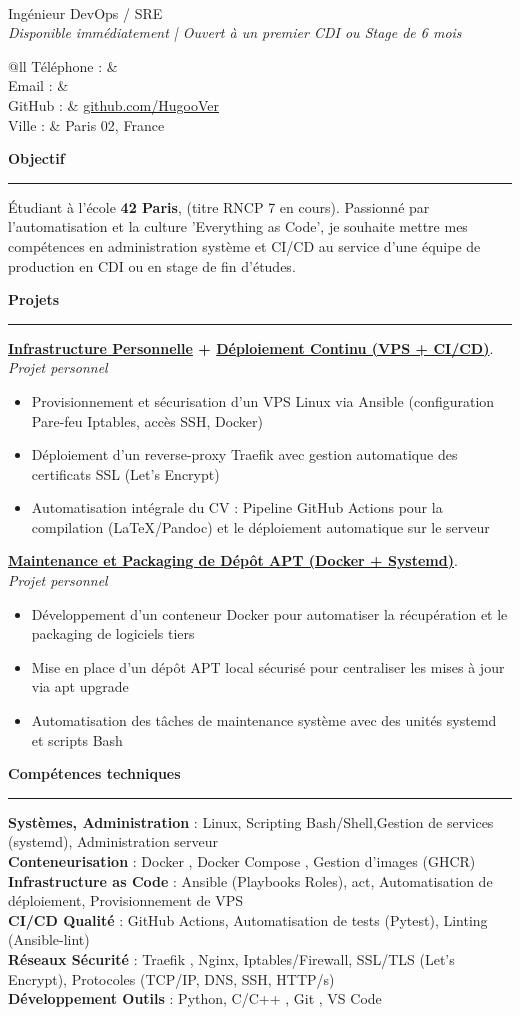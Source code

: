 \documentclass[10pt,a4paper]{article}
\makeatletter
\newcommand{\nom}{\detokenize{${NAME}}}
\newcommand{\poste}{Ingénieur DevOps / SRE}
\newcommand{\mail}{\detokenize{${MAIL}}}
\newcommand{\phone}{\detokenize{${PHONE}}}
\newcommand{\makecvheader}{
      \begin{minipage}[t]{0.6\textwidth}
        {\huge \textbf{\nom}}\\[0.2em]
        {\large \poste}\\[0.5em]
        \textit{Disponible immédiatement | Ouvert à un premier CDI ou Stage de 6 mois}
      \end{minipage}
      \hfill
      \begin{minipage}[t]{0.35\textwidth}
        \begin{tabular}{@{}ll}
          Téléphone : & \phone \\
          Email : & \href{mailto:\mail}{\mail{}} \\
          GitHub : & \href{https://github.com/HugooVer}{github.com/HugooVer} \\
          Ville : & Paris 02, France \\
        \end{tabular}
      \end{minipage}
      \vspace{0.4em}
    }
\newcommand{\cvsection}[1]{
      \vspace{0.8em}
      {\large\bfseries\textcolor{sectioncolor}{#1}}\\[-0.5em]
      \rule{\linewidth}{0.4pt}\vspace{0.4em}
    }
\makeatother
\begin{document}
\makecvheader


\cvsection{Objectif}
Étudiant à l'école \textbf{42 Paris}, (titre RNCP 7 en cours).  Passionné par l’automatisation et la culture 'Everything as Code', je souhaite mettre mes compétences en administration système et CI/CD au service d'une équipe de production en CDI ou en stage de fin d'études.

\cvsection{Projets}
\textbf{\href{https://github.com/HugooVer/my-vps}{Infrastructure Personnelle} + \href{https://github.com/HugooVer/Resume-CI-CD}{Déploiement Continu (VPS + CI/CD)}}.\\
\textit{Projet personnel}
\begin{itemize}
  \item Provisionnement et sécurisation d'un VPS Linux via Ansible (configuration Pare-feu Iptables, accès SSH, Docker)
  \item Déploiement d'un reverse-proxy Traefik avec gestion automatique des certificats SSL (Let's Encrypt)
  \item Automatisation intégrale du CV : Pipeline GitHub Actions pour la compilation (LaTeX/Pandoc) et le déploiement automatique sur le serveur
\end{itemize}

\textbf{\href{https://github.com/HugooVer/discord-repo-updater}{Maintenance et Packaging de Dépôt APT (Docker + Systemd)}}.\\
\textit{Projet personnel}
\begin{itemize}
  \item Développement d'un conteneur Docker pour automatiser la récupération et le packaging de logiciels tiers
  \item Mise en place d'un dépôt APT local sécurisé pour centraliser les mises à jour via apt upgrade
  \item Automatisation des tâches de maintenance système avec des unités systemd et scripts Bash
\end{itemize}

\cvsection{Compétences techniques}
\textbf{Systèmes, Administration} : Linux, Scripting Bash/Shell,Gestion de services (systemd), Administration serveur\\
\textbf{Conteneurisation} : Docker , Docker Compose , Gestion d'images (GHCR)\\
\textbf{Infrastructure as Code} : Ansible (Playbooks Roles), act, Automatisation de déploiement, Provisionnement de VPS\\
\textbf{CI/CD Qualité} : GitHub Actions, Automatisation de tests (Pytest), Linting (Ansible-lint)\\
\textbf{Réseaux Sécurité} : Traefik , Nginx, Iptables/Firewall, SSL/TLS (Let's Encrypt), Protocoles (TCP/IP, DNS, SSH, HTTP/s)\\
\textbf{Développement Outils} : Python, C/C++ , Git , VS Code
\end{document}
